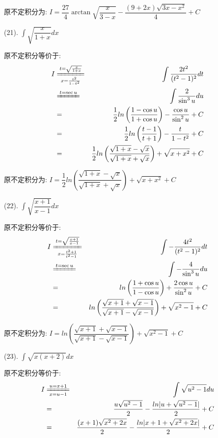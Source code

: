 \begin{anymark}[积分训练]
\begin{solution}
		原不定积分为:  $I=\dfrac{27}{4}\arctan\sqrt{\dfrac{x}{3-x}}-\dfrac{(9+2x)\sqrt{3x-x^2}}{4}+C$
	\end{solution}
	(21). $\int \sqrt{\dfrac{x}{1+x}}dx$
	\begin{solution}
		
		原不定积分等价于:  
		\begin{eqnarray*}
			I&\xlongequal[x=\frac{t^2}{1-t^2}]{t=\sqrt{\frac{x}{1+x}}}&\int\dfrac{2t^2}{(t^2-1)^2}dt\\
			&\xlongequal{t=\sec u}&\int \dfrac{2}{\sin^3 u}du\\
			&=&\dfrac{1}{2}ln\left(\dfrac{1-\cos u}{1+\cos u} \right)-\dfrac{\cos u}{\sin^2 u}+C\\
			&=&\dfrac{1}{2}ln\left(\dfrac{t-1}{t+1} \right)-\dfrac{t}{1-t^2}+C\\
			&=&\dfrac{1}{2}ln\left(\dfrac{\sqrt{1+x}-\sqrt{x}}{\sqrt{1+x}+\sqrt{x}} \right)+\sqrt{x+x^2}+C
		\end{eqnarray*}
		
		原不定积分为:  $I=\dfrac{1}{2}ln\left(\dfrac{\sqrt{1+x}-\sqrt{x}}{\sqrt{1+x}+\sqrt{x}} \right)+\sqrt{x+x^2}+C$
	\end{solution}
	(22). $\int \sqrt{\dfrac{x+1}{x-1}}dx$
	\begin{solution}
		
		原不定积分等价于:  
		\begin{eqnarray*}
			I&\xlongequal[x=\frac{t^2+1}{t^2-1}]{t=\sqrt{\frac{x+1}{x-1}}}&\int-\dfrac{4t^2}{(t^2-1)^2}dt\\
			&\xlongequal{t=\sec u}&\int -\dfrac{4}{\sin^3 u}du\\
			&=&ln\left(\dfrac{1+\cos u}{1-\cos u} \right)+\dfrac{2\cos u}{\sin^2 u}+C\\
			&=&ln\left(\dfrac{\sqrt{x+1}+\sqrt{x-1}}{\sqrt{x+1}-\sqrt{x-1}} \right)+\sqrt{x^2-1}+C
		\end{eqnarray*}
		
		原不定积分为:  $I=ln\left(\dfrac{\sqrt{x+1}+\sqrt{x-1}}{\sqrt{x+1}-\sqrt{x-1}} \right)+\sqrt{x^2-1}+C$
	\end{solution}
	(23). $\int \sqrt{x(x+2)}dx$
	\begin{solution}
		
		原不定积分等价于:  
		\begin{eqnarray*}
			I&\xlongequal[x=u-1]{u=x+1}&\int \sqrt{u^2-1}du\\
			&=&\dfrac{u\sqrt{u^2-1}}{2}-\dfrac{ln|u+\sqrt{u^2-1}|}{2}+C\\
			&=&\dfrac{(x+1)\sqrt{x^2+2x}}{2}-\dfrac{ln|x+1+\sqrt{x^2+2x}|}{2}+C
		\end{eqnarray*}
		

\end{solution}
\end{anymark}
